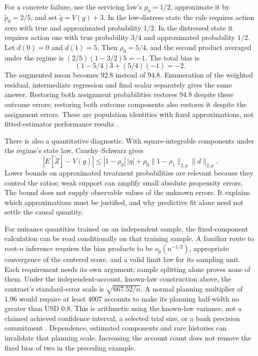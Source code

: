 For a concrete failure, use the servicing law's $p_0=1/2$, approximate it by
$\widetilde p_0=2/5$, and set $\widetilde q=V(g)+3$. In the low-distress
state the rule requires action zero with true and approximated probability
$1/2$. In the distressed state it requires action one with true probability
$3/4$ and approximated probability $1/2$. Let $d(0)=0$ and $d(1)=5$.
Then $\rho_0=5/4$, and the second product averaged under the regime is
$(2/5)(1-3/2)5=-1$. The total bias is
\[
 (1-5/4)3+(5/4)(-1)=-2.
\]
The augmented mean becomes 92.8 instead of 94.8. Enumeration of the weighted
residual, intermediate regression and final scalar separately gives the same
answer. Restoring both assignment probabilities restores 94.8 despite these
outcome errors; restoring both outcome components also restores it despite
the assignment errors. These are population identities with fixed
approximations, not fitted-estimator performance results
\citep{exec14_workflow_remainder}.

There is also a quantitative diagnostic. With square-integrable components
under the regime's state law, Cauchy--Schwarz gives
\[
 |E[\widetilde Z]-V(g)|
 \leq |1-\rho_0|\,|\eta|
 +\rho_0\|1-\rho_1\|_{2,g}\|d\|_{2,g}.
\]
Lower bounds on approximated treatment probabilities are relevant because
they control the ratios; weak support can amplify small absolute propensity
errors. The bound does not supply observable values of the unknown errors.
It explains which approximations must be justified, and why predictive fit
alone need not settle the causal quantity.

For nuisance quantities trained on an independent sample, the fixed-component
calculation can be read conditionally on that training sample. A familiar
route to root-$n$ inference requires the bias products to be
$o_p(n^{-1/2})$, appropriate convergence of the centered score, and a valid
limit law for its sampling unit. Each requirement needs its own argument;
sample splitting alone proves none of them. Under the independent-account,
known-law construction above, the contrast's standard-error scale is
$\sqrt{667.52/n}$. A normal planning multiplier of 1.96 would require at
least 4007 accounts to make its planning half-width no greater than USD 0.8.
This is arithmetic using the known-law variance, not a claimed achieved
confidence interval, a selected trial size, or a bank precision commitment
\citep{exec14_workflow_remainder}. Dependence, estimated components and rare
histories can invalidate that planning scale. Increasing the account count
does not remove the fixed bias of two in the preceding example.

